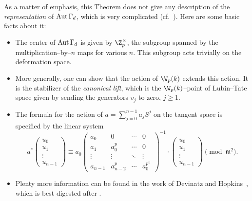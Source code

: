 \begin{remark}\label{StablizerRepIsComplicated}
As a matter of emphasis, this Theorem does not give any description of the \emph{representation} of $\operatorname{Aut} \Gamma_d$, which is very complicated (cf.\ ).  Here are some basic facts about it:
\begin{itemize}
    \item The center of $\operatorname{Aut} \Gamma_d$ is given by $\Z_p^\times$, the subgroup spanned by the multiplication--by--$n$ maps for various $n$.  This subgroup acts trivially on the deformation space.
    \item More generally, one can show that the action of $\W_p(k)$ extends this action.  It is the stabilizer of the \textit{canonical lift}, which is the $\W_p(k)$--point of Lubin--Tate space given by sending the generators $v_j$ to zero, $j \ge 1$.
    \item The formula for the action of $a = \sum_{j=0}^{n-1} a_j S^j$ on the tangent space is specified by the linear system \[a^* \left( \begin{array}{c} u_0 \\ u_1 \\ \vdots \\ u_{n-1} \end{array}\right) \equiv a_0 \left( \begin{array}{cccc} a_0 & 0 & \cdots & 0 \\ a_1 & a_0^p & \cdots & 0 \\ \vdots & \vdots & \ddots & \vdots \\ a_{n-1} & a_{n-2}^p & \cdots & a_0^{p^n} \end{array} \right)^{-1} \cdot \left( \begin{array}{c} u_0 \\ u_1 \\ \vdots \\ u_{n-1} \end{array} \right) \pmod{\mathfrak{m}^2}.\]
    \item Plenty more information can be found in the work of Devinatz and Hopkins~\cite{DevinatzHopkins}, which is best digested after .
\end{itemize}
\end{remark}

